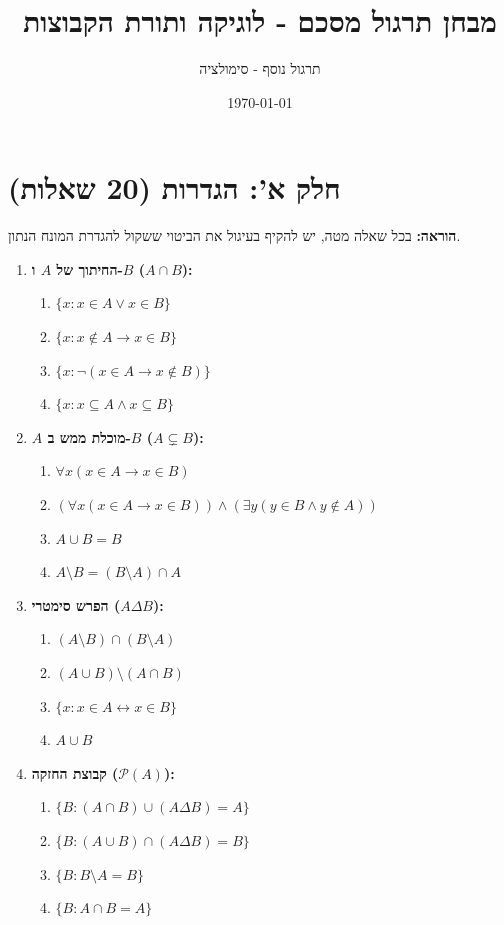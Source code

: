 \documentclass[a4paper,11pt]{article}
\title{מבחן תרגול מסכם - לוגיקה ותורת הקבוצות}
\author{תרגול נוסף - סימולציה}
\date{\today}
\newcommand{\powerset}{\mathcal{P}}
\newcommand{\liff}{\leftrightarrow}
\begin{document}
\maketitle

\section*{חלק א': הגדרות (20 שאלות)}
\textbf{הוראה:} בכל שאלה מטה, יש להקיף בעיגול את הביטוי ששקול להגדרת המונח הנתון.

\begin{enumerate}
    \item \textbf{החיתוך של \(A\) ו-\(B\) (\(A \cap B\)):}
          \begin{enumerate}
              \item \(\{x : x \in A \lor x \in B\}\)
              \item \(\{x : x \notin A \to x \in B\}\)
              \item \(\{x : \neg(x \in A \to x \notin B)\}\)
              \item \(\{x : x \subseteq A \land x \subseteq B\}\)
          \end{enumerate}

    \item \textbf{\(A\) מוכלת ממש ב-\(B\) (\(A \subsetneq B\)):}
          \begin{enumerate}
              \item \(\forall x(x \in A \to x \in B)\)
              \item \((\forall x(x \in A \to x \in B)) \land (\exists y(y \in B \land y \notin A))\)
              \item \(A \cup B = B\)
              \item \(A \setminus B = (B \setminus A) \cap A\)
          \end{enumerate}

    \item \textbf{הפרש סימטרי (\(A \Delta B\)):}
          \begin{enumerate}
              \item \((A \setminus B) \cap (B \setminus A)\)
              \item \((A \cup B) \setminus (A \cap B)\)
              \item \(\{x : x \in A \liff x \in B\}\)
              \item \(A \cup B\)
          \end{enumerate}

    \item \textbf{קבוצת החזקה (\(\powerset(A)\)):}
          \begin{enumerate}
              \item \(\{B : (A \cap B) \cup (A \Delta B) = A\}\)
              \item \(\{B : (A \cup B) \cap (A \Delta B) = B\}\)
              \item \(\{B : B \setminus A = B\}\)
              \item \(\{B : A \cap B = A\}\)
          \end{enumerate}


\end{enumerate}
\end{document}

